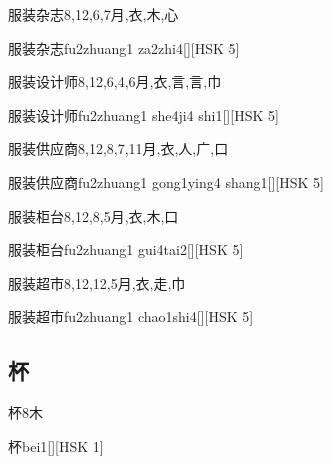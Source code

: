 \begin{Entry}{服装杂志}{8,12,6,7}{⽉,⾐,⽊,⼼}
  \begin{Phonetics}{服装杂志}{fu2zhuang1 za2zhi4}[][HSK 5]
  \end{Phonetics}
\end{Entry}

\begin{Entry}{服装设计师}{8,12,6,4,6}{⽉,⾐,⾔,⾔,⼱}
  \begin{Phonetics}{服装设计师}{fu2zhuang1 she4ji4 shi1}[][HSK 5]
  \end{Phonetics}
\end{Entry}

\begin{Entry}{服装供应商}{8,12,8,7,11}{⽉,⾐,⼈,⼴,⼝}
  \begin{Phonetics}{服装供应商}{fu2zhuang1 gong1ying4 shang1}[][HSK 5]
  \end{Phonetics}
\end{Entry}

\begin{Entry}{服装柜台}{8,12,8,5}{⽉,⾐,⽊,⼝}
  \begin{Phonetics}{服装柜台}{fu2zhuang1 gui4tai2}[][HSK 5]
  \end{Phonetics}
\end{Entry}

\begin{Entry}{服装超市}{8,12,12,5}{⽉,⾐,⾛,⼱}
  \begin{Phonetics}{服装超市}{fu2zhuang1 chao1shi4}[][HSK 5]
  \end{Phonetics}
\end{Entry}

\subsection*{杯}

\begin{Entry}{杯}{8}{⽊}
  \begin{Phonetics}{杯}{bei1}[][HSK 1]
  \end{Phonetics}
\end{Entry}

